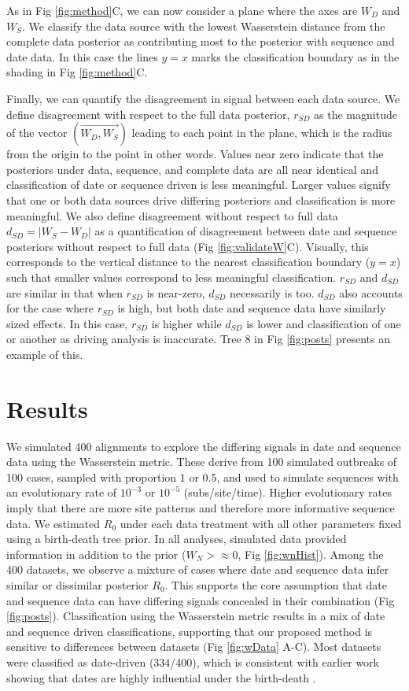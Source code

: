 \documentclass{article}
\begin{document}
As in Fig \ref{fig:method}C, we can now consider a plane where the axes are $W_{D}$ and $W_{S}$. We classify the data source with the lowest Wasserstein distance from the complete data posterior as contributing most to the posterior with sequence and date data. In this case the lines $y=x$ marks the classification boundary as in the shading in Fig \ref{fig:method}C.

Finally, we can quantify the disagreement in signal between each data source. We define disagreement with respect to the full data posterior, $r_{SD}$ as the magnitude of the vector $(\overrightarrow{W_{D}, W_{S}})$ leading to each point in the plane, which is the radius from the origin to the point in other words. Values near zero indicate that the posteriors under data, sequence, and complete data are all near identical and classification of date or sequence driven is less meaningful. Larger values signify that one or both data sources drive differing posteriors and classification is more meaningful. We also define disagreement without respect to full data $d_{SD} = | W_{S} - W_{D} |$ as a quantification of disagreement between date and sequence posteriors without respect to full data (Fig \ref{fig:validateW}C). Visually, this corresponds to the vertical distance to the nearest classification boundary ($y=x$) such that smaller values correspond to less meaningful classification. $r_{SD}$ and $d_{SD}$ are similar in that when $r_{SD}$ is near-zero,  $d_{SD}$ necessarily is too. $d_{SD}$ also accounts for the case where $r_{SD}$ is high, but both date and sequence data have similarly sized effects. In this case, $r_{SD}$ is higher while $d_{SD}$ is lower and classification of one or another as driving analysis is inaccurate. Tree 8 in Fig \ref{fig:posts} presents an example of this.

\section*{Results}
We simulated 400 alignments to explore the differing signals in date and sequence data using the Wasserstein metric. These derive from 100 simulated outbreaks of 100 cases, sampled with proportion 1 or 0.5, and used to simulate sequences with an evolutionary rate of $10^{-3}$ or $10^{-5}$ (subs/site/time). Higher evolutionary rates imply that there are more site patterns and therefore more informative sequence data. We estimated $R_0$ under each data treatment with all other parameters fixed using a birth-death tree prior. In all analyses, simulated data provided information in addition to the prior ($W_{N}>\approx0$, Fig \ref{fig:wnHist}). Among the 400 datasets, we  observe a mixture of cases where date and sequence data infer similar or dissimilar posterior $R_{0}$. This supports the core assumption that date and sequence data can have differing signals concealed in their combination (Fig \ref{fig:posts}). Classification using the Wasserstein metric results in a mix of date and sequence driven classifications, supporting that our proposed method is sensitive to differences between datasets (Fig \ref{fig:wData} A-C). Most datasets were classified as date-driven (334/400), which is consistent with earlier work showing that dates are highly influential under the birth-death \cite{volz_sampling_2014}. 
\end{document}
